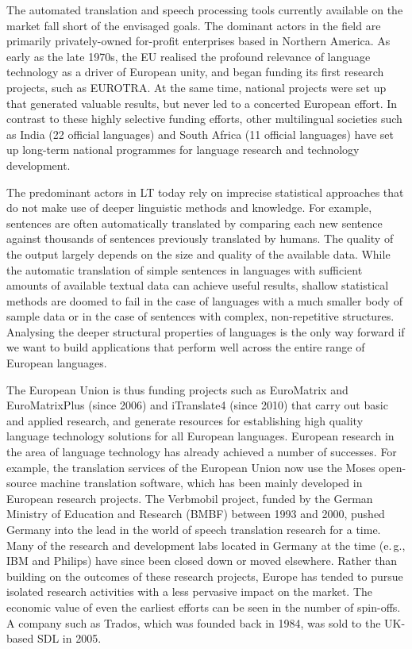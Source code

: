 \documentclass[]{../../metanetpaper}
\begin{document}
\begin{multicols}{2}
The automated translation and speech processing tools currently available on the market fall short of the envisaged goals. The dominant actors in the field are primarily privately-owned for-profit enterprises based in Northern America. As early as the late 1970s, the EU realised the profound relevance of language technology as a driver of European unity, and began funding its first research projects, such as EUROTRA. At the same time, national projects were set up that generated valuable results, but never led to a concerted European effort. In contrast to these highly selective funding efforts, other multilingual societies such as India (22 official languages) and South Africa (11 official languages) have set up long-term national programmes for language research and technology development. 

The predominant actors in LT today rely on imprecise statistical approaches that do not make use of deeper linguistic methods and knowledge. For example, sentences are often automatically translated by comparing each new sentence against thousands of sentences previously translated by humans. The quality of the output largely depends on the size and quality of the available  data. While the automatic translation of simple sentences in languages with sufficient amounts of available textual data can achieve useful results, shallow statistical methods are doomed to fail in the case of languages with a much smaller body of sample data or in the case of sentences with complex, non-repetitive structures. Analysing the deeper structural properties of languages is the only way forward if we want to build applications that perform well across the entire range of European languages.


The European Union is thus funding projects such as EuroMatrix and EuroMatrixPlus (since 2006) and iTranslate4 (since 2010) that carry out basic and applied research, and generate resources for establishing high quality language technology solutions for all European languages. 
European research in the area of language technology has already achieved a number of successes. For example, the translation services of the European Union now use the Moses open-source machine translation software, which has been mainly developed in European research projects. The Verbmobil project, funded by the German Ministry of Education and Research (BMBF) between 1993 and 2000, pushed Germany into the lead in the world of speech translation research for a time. Many of the research and development labs located in Germany at the time (e.\,g., IBM and Philips) have since been closed down or moved elsewhere. Rather than building on the outcomes of these research projects, Europe has tended to pursue isolated research activities with a less pervasive impact on the market. The economic value of even the earliest efforts can be seen in the number of spin-offs. A company such as Trados, which was founded back in 1984, was sold to the UK-based SDL in 2005.


\end{multicols}
\end{document}

